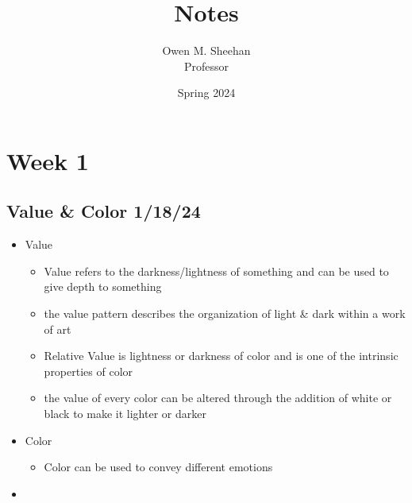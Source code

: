 \documentclass[12pt]{article}
\author{Owen M. Sheehan\\Professor \prof}
\date{Spring 2024}
\title{\class{} Notes}
\begin{document}
\maketitle
\tableofcontents
\newpage

    \section{Week 1}
        \subsection{Value \& Color 1/18/24}
        \bigskip
            \begin{itemize}
                \item Value
                \begin{itemize}
                    \item Value refers to the darkness/lightness of something and can be used to give depth to something
                    \item the value pattern describes the organization of light \& dark within a work of art
                    \item Relative Value is lightness or darkness of color and is one of the intrinsic properties of color
                    \item the value of every color can be altered through the addition of white or black to make it lighter or darker
                \end{itemize}

                \item Color
                \begin{itemize}
                    \item Color can be used to convey different emotions
                \end{itemize}

                \item
            \end{itemize}
\end{document}
